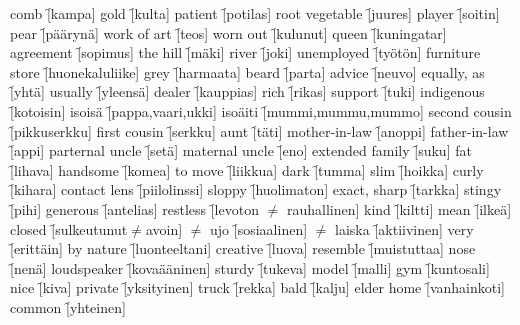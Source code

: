 \begin{questions}
  \begin{multicols}{3}
    \raggedcolumns
    \question comb \f[kampa]
    \question gold \f[kulta]
    \question patient \f[potilas]
    \question root vegetable \f[juures]
    \question player \f[soitin]
    \question pear \f[päärynä]
    \question work of art \f[teos]
    \question worn out \f[kulunut]
    \question queen \f[kuningatar]
    \question agreement \f[sopimus]
    \question the hill \f[mäki]
    \question river \f[joki]
    \question unemployed \f[työtön]
    \question furniture store \f[huonekaluliike]
    \question grey  \f[harmaata]
    \question beard \f[parta]
    \question advice \f[neuvo]
    \question equally, as \f[yhtä]
    \question usually \f[yleensä]
    \question dealer \f[kauppias]
    \question rich   \f[rikas]
    \question support \f[tuki]
    \question indigenous \f[kotoisin]
    \question isoisä  \f[pappa,vaari,ukki]
    \question isoäiti \f[mummi,mummu,mummo]
    \question second cousin \f[pikkuserkku]
    \question first cousin \f[serkku]
    \question aunt \f[täti]
    \question mother-in-law \f[anoppi]
    \question father-in-law \f[appi]
    \question parternal uncle \f[setä]
    \question maternal uncle \f[eno]
    \question extended family \f[suku]
    \question fat \f[lihava]
    \question handsome \f[komea]
    \question to move \f[liikkua]
    \question dark \f[tumma]
    \question slim \f[hoikka]
    \question curly \f[kihara]
    \question contact lens \f[piilolinssi]
    \question sloppy \f[huolimaton]
    \question exact, sharp \f[tarkka]
    \question stingy \f[pihi]
    \question generous \f[antelias]
    \question restless \f[levoton $\neq$ rauhallinen]
    \question kind \f[kiltti]
    \question mean \f[ilkeä]
    \question closed \f[sulkeutunut$\neq$avoin]
    \question $\neq$ ujo \f[sosiaalinen]
    \question $\neq$ laiska \f[aktiivinen]
    \question very \f[erittäin]
    \question by nature \f[luonteeltani]
    \question creative \f[luova]
    \question resemble \f[muistuttaa]
    \question nose \f[nenä]
    \question loudspeaker \f[kovaääninen]
    \question sturdy \f[tukeva]
    \question model \f[malli]
    \question gym \f[kuntosali]
    \question nice \f[kiva]
    \question private \f[yksityinen]
    \question truck \f[rekka]
    \question bald \f[kalju]
    \question elder home \f[vanhainkoti]
    \question common \f[yhteinen]
  \end{multicols}
\end{questions}

